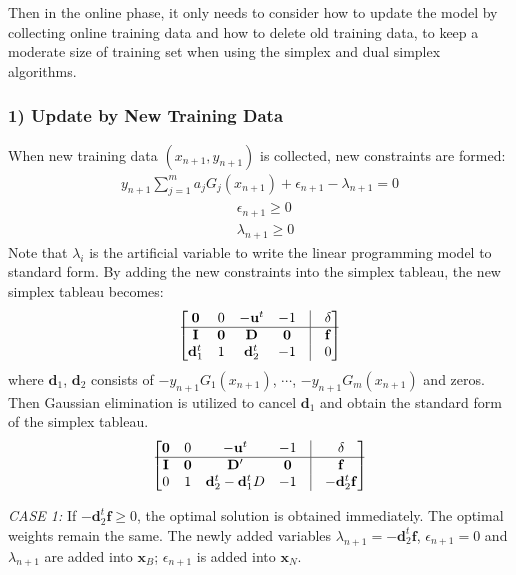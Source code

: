 \documentclass[letterpaper]{article}
\begin{document}
Then in the online phase, it only needs to consider how to update the model by collecting online training data and how to delete old training data, to keep a moderate size of training set when using the simplex and dual simplex algorithms.
\indent\indent \subsubsection{ 1) Update by New Training Data}
When new training data $(x_{n+1}, y_{n+1})$ is collected, new constraints are formed:
\begin{align}
y_{n+1}\sum_{j=1}^m a_jG_j(x_{n+1}) + \epsilon_{n+1} - \lambda_{n+1} = 0
\end{align}
\vspace{-0.8cm}
\begin{align*}
& \epsilon_{n+1} \geq 0 \\
& \lambda_{n+1} \geq 0
\end{align*}
Note that $\lambda_i$ is the artificial variable to write the linear programming model to standard form.  By adding the new constraints into the simplex tableau, the new simplex tableau becomes:
\begin{equation}
\begin{bmatrix}
\mathbf{0} & 0 & -\mathbf{u}^t & -1 & \vline & \mathbf{\delta} \\
\hline
\mathbf{I} & \mathbf{0} & \mathbf{D} & \mathbf{0} & \vline & \mathbf{f} \\
\mathbf{d}^t_1 & 1 & \mathbf{d}^t_2 & -1 & \vline & 0
\end{bmatrix}
\end{equation}
where $\mathbf{d}_1$, $\mathbf{d}_2$ consists of $-y_{n+1}G_1(x_{n+1})$, $\cdots$, $-y_{n+1}G_m(x_{n+1})$ and zeros. Then Gaussian elimination is utilized to cancel $\mathbf{d}_1$ and obtain the standard form of the simplex tableau.
\begin{equation}
\begin{bmatrix}
\mathbf{0} & 0 & -\mathbf{u}^t & -1 & \vline & \mathbf{\delta} \\
\hline
\mathbf{I} & \mathbf{0} &\mathbf{D'} & \mathbf{0} & \vline & \mathbf{f} \\
0 & 1 & \mathbf{d}^t_2 - \mathbf{d}^t_1D & -1 & \vline & -\mathbf{d}^t_2\mathbf{f}
\end{bmatrix}
\end{equation}

\emph{CASE 1:} If $-\mathbf{d}^t_2\mathbf{f} \geq 0$, the optimal solution is obtained immediately. The optimal weights remain the same. The newly added variables $\lambda_{n+1} = -\mathbf{d}^t_2\mathbf{f}$, $\epsilon_{n+1} = 0$ and $\lambda_{n+1}$ are added into $\mathbf{x}_B$; $\epsilon_{n+1}$ is added into $\mathbf{x}_N$.
\end{document}
